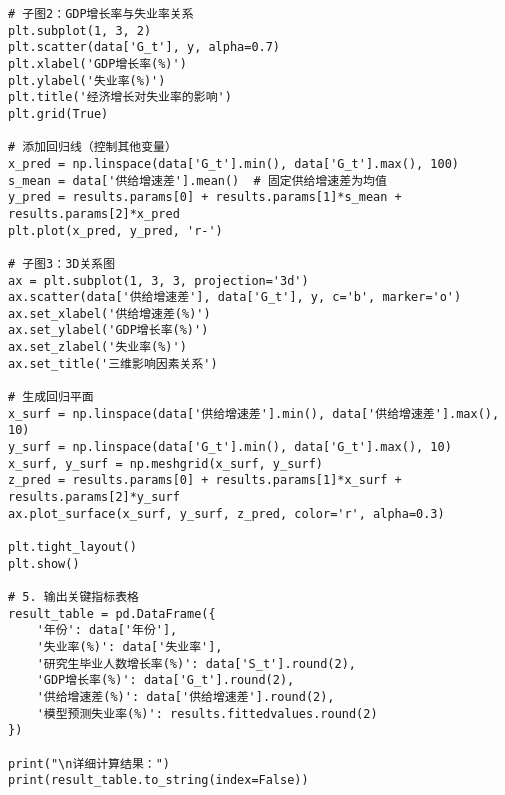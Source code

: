 \documentclass[withoutpreface,bwprint]{cumcmthesis} %
\begin{document}
\begin{verbatim}
# 子图2：GDP增长率与失业率关系
plt.subplot(1, 3, 2)
plt.scatter(data['G_t'], y, alpha=0.7)
plt.xlabel('GDP增长率(%)')
plt.ylabel('失业率(%)')
plt.title('经济增长对失业率的影响')
plt.grid(True)

# 添加回归线（控制其他变量）
x_pred = np.linspace(data['G_t'].min(), data['G_t'].max(), 100)
s_mean = data['供给增速差'].mean()  # 固定供给增速差为均值
y_pred = results.params[0] + results.params[1]*s_mean + results.params[2]*x_pred
plt.plot(x_pred, y_pred, 'r-')

# 子图3：3D关系图
ax = plt.subplot(1, 3, 3, projection='3d')
ax.scatter(data['供给增速差'], data['G_t'], y, c='b', marker='o')
ax.set_xlabel('供给增速差(%)')
ax.set_ylabel('GDP增长率(%)')
ax.set_zlabel('失业率(%)')
ax.set_title('三维影响因素关系')

# 生成回归平面
x_surf = np.linspace(data['供给增速差'].min(), data['供给增速差'].max(), 10)
y_surf = np.linspace(data['G_t'].min(), data['G_t'].max(), 10)
x_surf, y_surf = np.meshgrid(x_surf, y_surf)
z_pred = results.params[0] + results.params[1]*x_surf + results.params[2]*y_surf
ax.plot_surface(x_surf, y_surf, z_pred, color='r', alpha=0.3)

plt.tight_layout()
plt.show()

# 5. 输出关键指标表格
result_table = pd.DataFrame({
    '年份': data['年份'],
    '失业率(%)': data['失业率'],
    '研究生毕业人数增长率(%)': data['S_t'].round(2),
    'GDP增长率(%)': data['G_t'].round(2),
    '供给增速差(%)': data['供给增速差'].round(2),
    '模型预测失业率(%)': results.fittedvalues.round(2)
})

print("\n详细计算结果：")
print(result_table.to_string(index=False))
\end{verbatim}



\newpage
\end{document}
